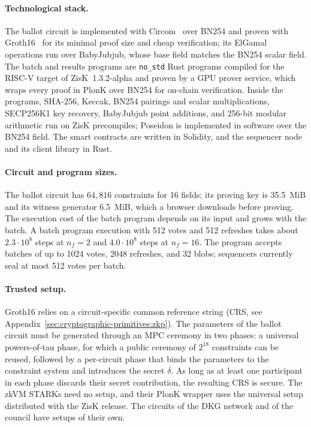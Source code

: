\paragraph{Technological stack.}
The ballot circuit is implemented with Circom~\cite{belles2023circom} over BN254 and proven with Groth16~\cite{groth2016size} for its minimal proof size and cheap verification; its ElGamal operations run over BabyJubjub, whose base field matches the BN254 scalar field. The batch and results programs are \texttt{no\_std} Rust programs compiled for the RISC-V target of ZisK~1.3.2-alpha and proven by a GPU prover service, which wraps every proof in PlonK over BN254 for on-chain verification. Inside the programs, SHA-256, Keccak, BN254 pairings and scalar multiplications, SECP256K1 key recovery, BabyJubjub point additions, and 256-bit modular arithmetic run on ZisK precompiles; Poseidon is implemented in software over the BN254 field. The smart contracts are written in Solidity, and the sequencer node and its client library in Rust.

\paragraph{Circuit and program sizes.} The ballot circuit has $64{,}816$ constraints for 16 fields; its proving key is 35.5~MiB and its witness generator 6.5~MiB, which a browser downloads before proving. The execution cost of the batch program depends on its input and grows with the batch. A batch program execution with 512 votes and 512 refreshes takes about $2.3 \cdot 10^8$ steps at $n_f = 2$ and $4.0 \cdot 10^8$ steps at $n_f = 16$. The program accepts batches of up to 1024 votes, 2048 refreshes, and 32 blobs; sequencers currently seal at most 512 votes per batch.

\paragraph{Trusted setup.} Groth16 relies on a circuit-specific common reference string (\ac{CRS}, see Appendix~\ref{sec:cryptographic-primitives:zkp}). The parameters of the ballot circuit must be generated through an \ac{MPC} ceremony in two phases: a universal powers-of-tau phase, for which a public ceremony of $2^{18}$ constraints can be reused, followed by a per-circuit phase that binds the parameters to the constraint system and introduces the secret $\delta$. As long as at least one participant in each phase discards their secret contribution, the resulting \ac{CRS} is secure. The \ac{zkVM} \acp{STARK} need no setup, and their PlonK wrapper uses the universal setup distributed with the ZisK release. The circuits of the \ac{DKG} network and of the council have setups of their own.

